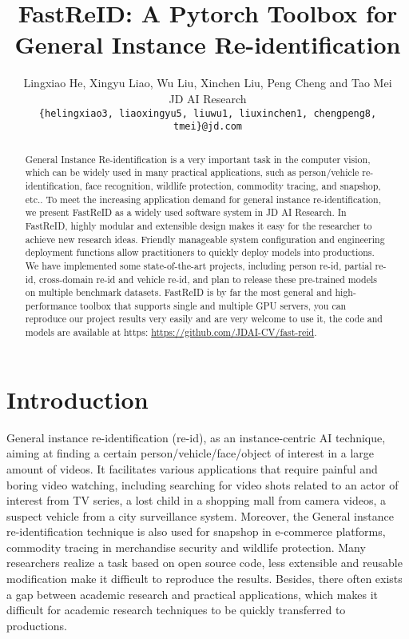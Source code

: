 \documentclass[10pt,twocolumn,letterpaper]{article}
\begin{document}
\title{FastReID: A Pytorch Toolbox for General Instance Re-identification} 
\author{Lingxiao He, Xingyu Liao, Wu Liu, Xinchen Liu, Peng Cheng and Tao Mei \\
JD AI Research\\
{\tt\small \{helingxiao3, liaoxingyu5, liuwu1, liuxinchen1, chengpeng8, tmei\}@jd.com}
}

\maketitle


\begin{abstract}

\dagger
General Instance Re-identification is a very important task in the computer vision, which can be widely used in many practical applications, such as person/vehicle re-identification, face recognition, wildlife protection, commodity tracing, and snapshop, etc.. To meet the increasing application demand for general instance re-identification, we present FastReID as a widely used software system in JD AI Research. In FastReID, highly modular and extensible design makes it easy for the researcher to achieve new research ideas. Friendly manageable system configuration and engineering deployment functions allow practitioners to quickly deploy models into productions. We have implemented some state-of-the-art projects, including person re-id, partial re-id, cross-domain re-id and vehicle re-id, and plan to release these pre-trained models on multiple benchmark datasets. FastReID is by far the most general and high-performance toolbox that supports single and multiple GPU servers, you can reproduce our project results very easily and are very welcome to use it, the code and models are available at https: \url{https://github.com/JDAI-CV/fast-reid}.


\end{abstract}
\section{Introduction}
General instance re-identification (re-id), as an instance-centric AI technique, aiming at finding a certain person/vehicle/face/object of interest in a large amount of videos. It facilitates various applications that require painful and boring video watching, including searching for video shots related to an actor of interest from TV series, a lost child in a shopping mall from camera videos, a suspect vehicle from a city surveillance system. Moreover, the General instance re-identification technique is also used for snapshop in e-commerce platforms, commodity tracing in merchandise security and wildlife protection. Many researchers realize a task based on open source code, less extensible and reusable modification make it difficult to reproduce the results. Besides, there often exists a gap between academic research and practical applications, which makes it difficult for academic research techniques to be quickly transferred to productions.
\end{document}
